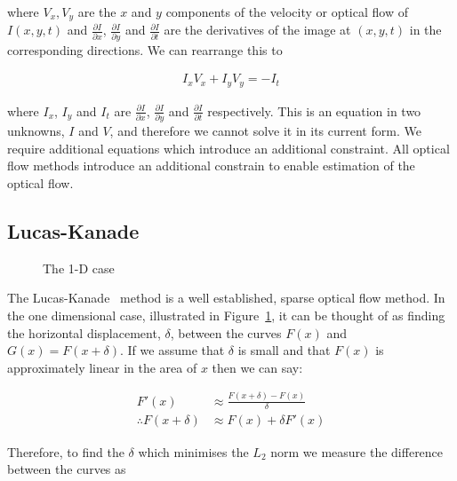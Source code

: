 where $V_x,V_y$ are the $x$ and $y$ components of the velocity or optical flow of $I(x,y,t)$ and $\tfrac{\partial I}{\partial x}$, $\tfrac{\partial I}{\partial y}$ and $\tfrac{\partial I}{\partial t}$ are the derivatives of the image at $(x,y,t)$ in the corresponding directions. We can rearrange this to

\begin{align*}
  I_xV_x+I_yV_y=-I_t
\end{align*}

where $I_x$, $I_y$ and $I_t$ are $\tfrac{\partial I}{\partial x}$, $\tfrac{\partial I}{\partial y}$ and $\tfrac{\partial I}{\partial t}$ respectively. This is an equation in two unknowns, $I$ and $V$, and therefore we cannot solve it in its current form. We require additional equations which introduce an additional constraint. All optical flow methods introduce an additional constrain to enable estimation of the optical flow.

\subsection{Lucas-Kanade}

\begin{figure}[h]
  \centering
  \caption{The 1-D case}
  \label{fig:lucas-kanade}
\end{figure}

The Lucas-Kanade~\cite{lucas-kanade} method is a well established, sparse optical flow method. In the one dimensional case, illustrated in Figure~\ref{fig:lucas-kanade}, it can be thought of as finding the horizontal displacement, $\delta$, between the curves $F(x)$ and $G(x)=F(x+\delta)$. If we assume that $\delta$ is small and that $F(x)$ is approximately linear in the area of $x$ then we can say:

\begin{align*}
F'(x) &\approx \frac{F(x+\delta)-F(x)}{\delta} \\
\therefore F(x + \delta) &\approx F(x) + \delta F'(x) 
\end{align*}

Therefore, to find the $\delta$ which minimises the $L_2$ norm we measure the difference between the curves as

